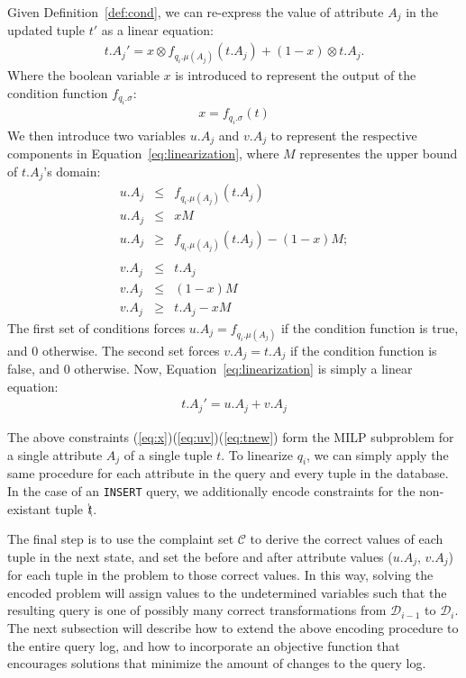 Given Definition~\ref{def:cond}, we can re-express the value of attribute $A_j$ 
in the updated tuple $t'$ as a linear equation:
{\scriptsize
\begin{eqnarray}
\label{eq:linearization}
t.A_j' = x\otimes f_{q_i.\mu(A_j)} (t.A_j) + (1-x)\otimes t.A_j. 
\end{eqnarray} 
}
\noindent Where the boolean variable $x$ is introduced to represent the output of 
the condition function $f_{q_i.\sigma}$:
{\scriptsize
\begin{eqnarray}
\label{eq:x}
x = f_{{q_i}.\sigma}(t)
\end{eqnarray}
}
We then introduce two variables $u.A_j$ and $v.A_j$ to represent 
the respective components in Equation~\ref{eq:linearization}, where
$M$ representes the upper bound of $t.A_j$'s domain:
{\scriptsize 
\begin{eqnarray}
\label{eq:uv}
u.A_j &\leq & f_{q_i.\mu(A_j)} (t.A_j) \nonumber\\
u.A_j &\leq & xM \nonumber\\ 
u.A_j &\geq & f_{q_i.\mu(A_j)} (t.A_j) - (1-x)M ; \nonumber \\\nonumber \\
v.A_j &\leq & t.A_j \nonumber\\
v.A_j &\leq & (1-x)M \nonumber\\
v.A_j &\geq & t.A_j - xM
\end{eqnarray}
}
The first set of conditions forces $u.A_j = f_{q_i.\mu(A_j)}$ if the condition function
is true, and $0$ otherwise.  The second set forces $v.A_j = t.A_j$ if the condition function
is false, and $0$ otherwise.  Now, Equation~\ref{eq:linearization} is simply a linear equation:
{\scriptsize\begin{eqnarray}
\label{eq:tnew}
t.A_j' = u.A_j + v.A_j
\end{eqnarray}}


The above constraints (\ref{eq:x})(\ref{eq:uv})(\ref{eq:tnew})
form the MILP subproblem for a single attribute $A_j$ of a single tuple $t$.
To linearize $q_i$, we can simply apply the same procedure for each attribute in the 
query and every tuple in the database.
In the case of an \texttt{INSERT} query, we additionally encode constraints for
the non-existant tuple $\bcancel{t}$.

The final step is to use the complaint set $\mathcal{C}$ to derive the correct values
of each tuple in the next state, and set the before and after attribute values ($u.A_j$, $v.A_j$)
for each tuple in the problem to those correct values.
In this way, solving the encoded problem will assign values to the undetermined variables
such that the resulting query is one of possibly many correct transformations from 
$\mathcal{D}_{i-1}$ to $\mathcal{D}_i$.
The next subsection will describe how to extend the above encoding procedure to the 
entire query log, and how to incorporate an objective function that encourages solutions
that minimize the amount of changes to the query log.






